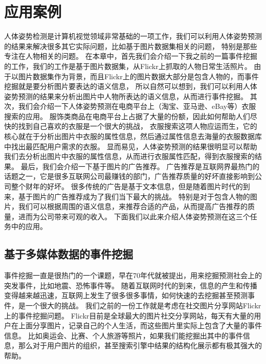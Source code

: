 
\chapter{应用案例}
\label{chap:app}
人体姿势检测是计算机视觉领域非常基础的一项工作，我们可以利用人体姿势预测的结果来解决很多其它实际问题，比如基于图片数据集相关的问题，
特别是那些专注在人物相关的问题。
在本章中，首先我们会介绍一下我之前的一篇事件挖掘的工作，我们的工作是基于图片数据集，从Flickr上抓取的人物日常生活照片。
由于以图片数据集作为背景，而且Flickr上的图片数据大部分是包含人物的，而事件挖掘就是要分析图片要表达的语义信息，
所以自然可以想到，我们可以利用人体姿势预测的结果来分析出图片中人物所表达的语义信息，从而进行事件挖掘。
其次，我们会介绍一下人体姿势预测在电商平台上（淘宝、亚马逊、eBay等）衣服搜索的应用。
服饰类商品在电商平台上占据了大量的份额，因此如何帮助人们尽快的找到自己喜欢的衣服是一个很大的挑战，
衣服搜索这项人物应运而生，它的核心就在于分析出图片中衣服的属性信息，然后通过属性信息去海量的衣服数据库中找出最匹配用户需求的衣服。
显而易见，人体姿势预测的结果很明显可以帮助我们去分析出图片中衣服的属性信息，从而进行衣服属性匹配，得到衣服搜索的结果。
最后，我们会介绍一下基于图片的广告推荐。
广告推荐是互联网界最热门的话题之一，它是很多互联网公司最赚钱的部门，广告推荐质量的好坏直接影响到公司整个财年的好坏。
很多传统的广告是基于文本信息，但是随着图片时代的到来，基于图片的广告推荐成为了我们当下最大的挑战。
特别是对于包含人物的图片，我们可以根据周围的语义信息，来推荐合适的产品，从而提高广告推荐的质量，进而为公司带来可观的收入。
下面我们以此来介绍人体姿势预测在这三个任务中的应用。

\section{基于多媒体数据的事件挖掘}
事件挖掘一直是很热门的一个课题，早在70年代就被提出，用来挖掘预测社会上的突发事件，比如地震、恐怖事件等。
随着互联网时代的到来，信息的产生和传播变得越来越迅速，互联网上发生了很多很多事情，如何快速的去挖掘甚至预测事件，是一个很大的挑战。
我们之前的一份工作就是考虑在社交图片分享网站Flickr上的事件挖掘问题。
Flickr目前是全球最大的图片社交分享网站，每天有大量的用户在上面分享图片，记录自己的个人生活，而这些图片里实际上包含了大量的事件信息。
比如奥运会、比赛、个人旅游等照片，如果我们能挖掘出其中的事件信息，那么对于用户图片的组织，甚至搜索引擎中结果的结构化展示都有极其强大的帮助。

